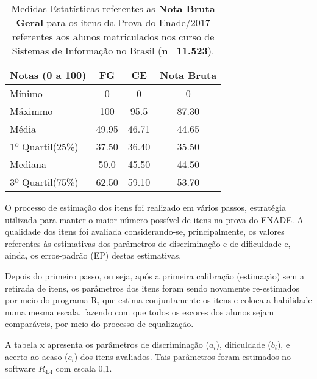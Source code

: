 \documentclass[12pt]{article}
\begin{document}
\begin{table}[htb]
	\centering
	\caption{Medidas Estatísticas referentes as \textbf{Nota Bruta Geral} para os itens da Prova do Enade/2017 referentes aos alunos matriculados nos curso de Sistemas de Informação no Brasil (\textbf{n=11.523}).}
\begin{tabular}{l|c|c|c}
\hline\hline 
    Notas (0 a 100)           &    FG    &   CE  &  Nota Bruta  \\
\hline\hline
 Mínimo            &  0      &  0                   &  0           \\
 Máximmo           &  100    &  95.5                &  87.30       \\
 Média             & 49.95   &  46.71               &  44.65       \\
 1º Quartil(25\%)  &  37.50  &  36.40               &  35.50       \\
 Mediana           &  50.0   & 45.50                &  44.50       \\
 3º Quartil(75\%)  &  62.50  &  59.10               &  53.70       \\
\hline\hline
\end{tabular}
\end{table}
\vskip0.3cm





O processo de estimação dos itens foi realizado em vários passos, estratégia utilizada para manter o maior número possível de itens na prova do ENADE. A qualidade dos itens foi avaliada considerando-se, principalmente, os valores referentes às estimativas dos parâmetros de discriminação e de dificuldade e, ainda, os erros-padrão (EP) destas estimativas.

Depois do primeiro passo, ou seja, após a primeira calibração (estimação) sem a retirada de itens, os parâmetros dos itens foram sendo novamente re-estimados por meio do programa R, que estima conjuntamente os itens e coloca a habilidade numa mesma escala, fazendo com que todos os escores dos alunos sejam comparáveis, por meio do processo de equalização.

A tabela x apresenta os parâmetros de discriminação ($a_{i}$), dificuldade ($b_{i}$), e acerto ao acaso ($c_{i}$) dos itens avaliados. Tais parâmetros foram estimados no software $R_{4.4}$ com escala 0,1.
\end{document}
